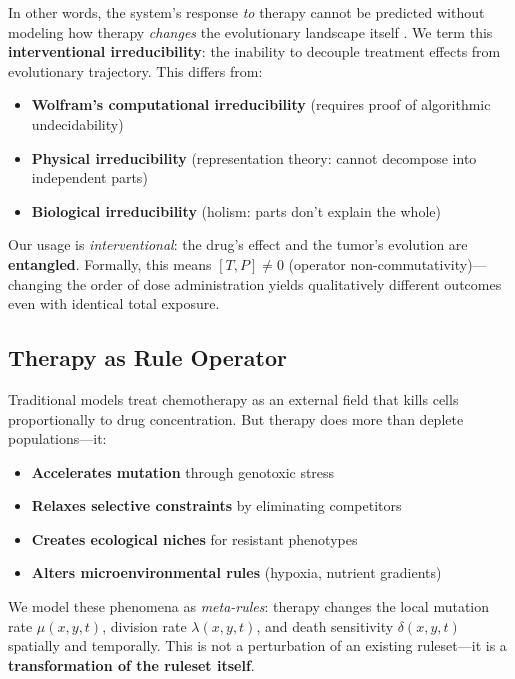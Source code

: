 \documentclass[11pt,a4paper]{article}
\begin{document}
In other words, the system's response \textit{to} therapy cannot be predicted without modeling how therapy \textit{changes} the evolutionary landscape itself \citep{merlo2006cancer, gatenby2009adaptive}. We term this \textbf{interventional irreducibility}: the inability to decouple treatment effects from evolutionary trajectory. This differs from:
\begin{itemize}
    \item \textbf{Wolfram's computational irreducibility} (requires proof of algorithmic undecidability)
    \item \textbf{Physical irreducibility} (representation theory: cannot decompose into independent parts)
    \item \textbf{Biological irreducibility} (holism: parts don't explain the whole)
\end{itemize}
Our usage is \textit{interventional}: the drug's effect and the tumor's evolution are \textbf{entangled}. Formally, this means $[T,P] \neq 0$ (operator non-commutativity)---changing the order of dose administration yields qualitatively different outcomes even with identical total exposure.

\subsection{Therapy as Rule Operator}

Traditional models treat chemotherapy as an external field that kills cells proportionally to drug concentration. But therapy does more than deplete populations---it:
\begin{itemize}
    \item \textbf{Accelerates mutation} through genotoxic stress \citep{chen2012drug}
    \item \textbf{Relaxes selective constraints} by eliminating competitors
    \item \textbf{Creates ecological niches} for resistant phenotypes
    \item \textbf{Alters microenvironmental rules} (hypoxia, nutrient gradients)
\end{itemize}

We model these phenomena as \textit{meta-rules}: therapy changes the local mutation rate $\mu(x,y,t)$, division rate $\lambda(x,y,t)$, and death sensitivity $\delta(x,y,t)$ spatially and temporally. This is not a perturbation of an existing ruleset---it is a \textbf{transformation of the ruleset itself}.
\end{document}
